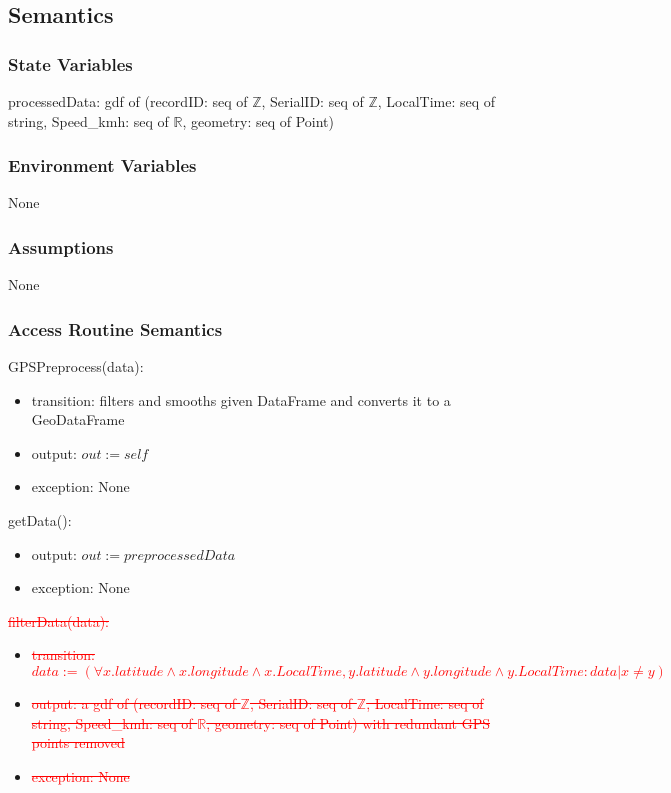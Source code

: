 \documentclass[12pt, titlepage]{article}
\begin{document}
\subsection{Semantics}

\subsubsection{State Variables}

processedData:  gdf of (recordID: seq of $\mathbb{Z}$, SerialID: seq of $\mathbb{Z}$, LocalTime: seq of string, Speed\_kmh: seq of $\mathbb{R}$, geometry: seq of Point)

\subsubsection{Environment Variables}

None

\subsubsection{Assumptions}

None

\subsubsection{Access Routine Semantics}

\noindent GPSPreprocess(data):
\begin{itemize}
\item transition: filters and smooths given DataFrame and converts it to a GeoDataFrame
\item output: $out := self$
\item exception: None
\end{itemize}

\noindent getData():
\begin{itemize}
\item output: $out := preprocessedData$
\item exception: None
\end{itemize}

\noindent\textcolor{red}{\sout{filterData(data):}}
\begin{itemize}
\item \textcolor{red}{\sout{transition: \textcolor{red}{$data := (\forall x.latitude \wedge x.longitude \wedge x.LocalTime, 
y.latitude \wedge y.longitude \wedge y.LocalTime : data | x \neq y)$}}}
\item \textcolor{red}{\sout{output: a gdf of (recordID: seq of $\mathbb{Z}$, SerialID: seq of $\mathbb{Z}$, LocalTime: seq of string, Speed\_kmh: seq of $\mathbb{R}$, geometry: seq of Point) with redundant GPS points removed}}
\item \textcolor{red}{\sout{exception: None}}
\end{itemize}
\end{document}
